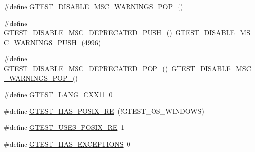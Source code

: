\begin{DoxyCompactItemize}
\item 
\#define \mbox{\hyperlink{_obj__test_2lib_2googletest-release-1_88_81_2googletest_2include_2gtest_2internal_2gtest-port_8h_ab4c44546d6d9aced68993b87b608fc06}{G\+T\+E\+S\+T\+\_\+\+D\+I\+S\+A\+B\+L\+E\+\_\+\+M\+S\+C\+\_\+\+W\+A\+R\+N\+I\+N\+G\+S\+\_\+\+P\+O\+P\+\_\+}}()
\item 
\#define \mbox{\hyperlink{_obj__test_2lib_2googletest-release-1_88_81_2googletest_2include_2gtest_2internal_2gtest-port_8h_a5b130138db254deaf29dbe3dffa1a2a8}{G\+T\+E\+S\+T\+\_\+\+D\+I\+S\+A\+B\+L\+E\+\_\+\+M\+S\+C\+\_\+\+D\+E\+P\+R\+E\+C\+A\+T\+E\+D\+\_\+\+P\+U\+S\+H\+\_\+}}()~\mbox{\hyperlink{_obj__test_2lib_2googletest-release-1_88_81_2googletest_2src_2gtest-internal-inl_8h_a88f79832f9d045112a76e9da8611cc13}{G\+T\+E\+S\+T\+\_\+\+D\+I\+S\+A\+B\+L\+E\+\_\+\+M\+S\+C\+\_\+\+W\+A\+R\+N\+I\+N\+G\+S\+\_\+\+P\+U\+S\+H\+\_\+}}(4996)
\item 
\#define \mbox{\hyperlink{_obj__test_2lib_2googletest-release-1_88_81_2googletest_2include_2gtest_2internal_2gtest-port_8h_aa0dc86dc9837f1610e91da65458f53b3}{G\+T\+E\+S\+T\+\_\+\+D\+I\+S\+A\+B\+L\+E\+\_\+\+M\+S\+C\+\_\+\+D\+E\+P\+R\+E\+C\+A\+T\+E\+D\+\_\+\+P\+O\+P\+\_\+}}()~\mbox{\hyperlink{_obj__test_2lib_2googletest-release-1_88_81_2googletest_2include_2gtest_2internal_2gtest-port_8h_ab4c44546d6d9aced68993b87b608fc06}{G\+T\+E\+S\+T\+\_\+\+D\+I\+S\+A\+B\+L\+E\+\_\+\+M\+S\+C\+\_\+\+W\+A\+R\+N\+I\+N\+G\+S\+\_\+\+P\+O\+P\+\_\+}}()
\item 
\#define \mbox{\hyperlink{_obj__test_2lib_2googletest-release-1_88_81_2googletest_2include_2gtest_2internal_2gtest-port_8h_a6e310924e9ce4a9f8fda1b189cc680c4}{G\+T\+E\+S\+T\+\_\+\+L\+A\+N\+G\+\_\+\+C\+X\+X11}}~0
\item 
\#define \mbox{\hyperlink{_obj__test_2lib_2googletest-release-1_88_81_2googletest_2include_2gtest_2internal_2gtest-port_8h_af5c4295ea1d76f07f65934f659792431}{G\+T\+E\+S\+T\+\_\+\+H\+A\+S\+\_\+\+P\+O\+S\+I\+X\+\_\+\+RE}}~(!G\+T\+E\+S\+T\+\_\+\+O\+S\+\_\+\+W\+I\+N\+D\+O\+WS)
\item 
\#define \mbox{\hyperlink{_obj__test_2lib_2googletest-release-1_88_81_2googletest_2include_2gtest_2internal_2gtest-port_8h_acecef794eeb09598cd47da764271cb18}{G\+T\+E\+S\+T\+\_\+\+U\+S\+E\+S\+\_\+\+P\+O\+S\+I\+X\+\_\+\+RE}}~1
\item 
\#define \mbox{\hyperlink{_obj__test_2lib_2googletest-release-1_88_81_2googletest_2include_2gtest_2internal_2gtest-port_8h_aedcf220690e6589d0fc2bd3db768ea66}{G\+T\+E\+S\+T\+\_\+\+H\+A\+S\+\_\+\+E\+X\+C\+E\+P\+T\+I\+O\+NS}}~0

\end{DoxyCompactItemize}
